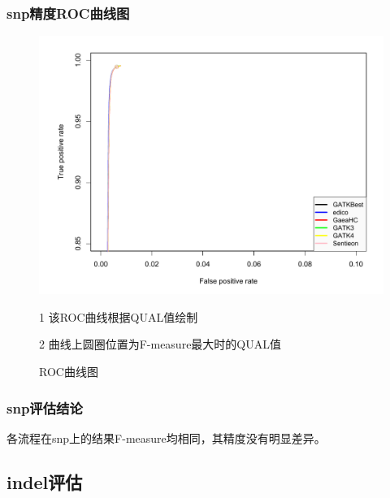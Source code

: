 \documentclass[UTF8,10pt,a4paper]{ctexart}
\begin{document}
\subsubsection{snp精度ROC曲线图}
\begin{figure}[htb]
\begin{center}
\begin{threeparttable}
\label{snp}
\includegraphics[width=15cm]{snp.pdf}
\caption{ROC曲线图}
\begin{tablenotes}
\item[1] {\kaishu 该ROC曲线根据QUAL值绘制}
\item[2] {\kaishu 曲线上圆圈位置为F-measure最大时的QUAL值}
\end{tablenotes}
\end{threeparttable}
\end{center}
\end{figure}
\subsubsection{snp评估结论}
	各流程在snp上的结果F-measure均相同，其精度没有明显差异。

\subsection{indel评估}
\end{document}
